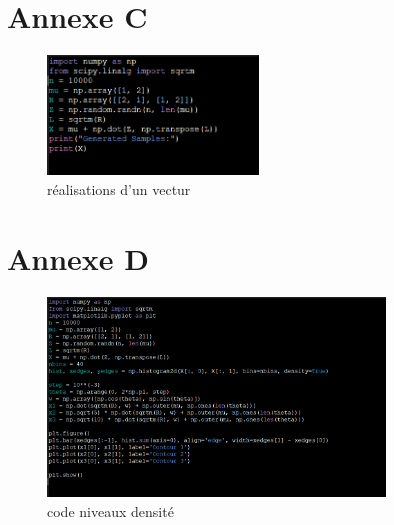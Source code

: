 \documentclass[a4paper]{article}
\begin{document}
\section{Annexe C}
\begin{figure}[h]
  \centering
  \includegraphics[width=0.5\textwidth]{5.png}
  \caption{réalisations d'un vectur}
\end{figure}
\newpage
\section{Annexe D}
\begin{figure}[h]
  \centering
  \includegraphics[width=0.8\textwidth]{8.png}
  \caption{code niveaux densité}
\end{figure}
\end{document}
